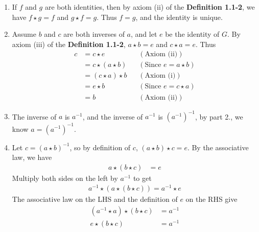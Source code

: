 {\begin{enumerate}[leftmargin=20pt, itemsep=0pt, topsep=3pt]
    \item If $f$ and $g$ are both identities, then by axiom (ii) of the \textbf{\textsf{\color{green!60!blue} Definition 1.1-2}},
    we have $f\star g = f$ and $g\star f = g$. Thus $f=g$, and the identity is unique.
\end{enumerate}}
\newpage
\thispagestyle{evenpagestyle}
\Proppf
{\begin{enumerate}[leftmargin=20pt, itemsep=0pt, topsep=0pt]
    \setcounter{enumi}{1}
    \item Assume $b$ and $c$ are both inverses of $a$, and let $e$ be the identity of $G$.
    By axiom (iii) of the \textbf{\textsf{\color{green!60!blue} Definition 1.1-2}}, $a\star b=e$ and $c\star a=e$.
    Thus
    \begin{align*}
        c &= c\star e \hspace{10pt}&(\text{Axiom (ii)})\\
        &= c\star (a\star b) \hspace{10pt}&(\text{Since } e = a\star b)\\
        &= (c\star a)\star b \hspace{10pt}&(\text{Axiom (i)})\\
        &= e\star b \hspace{10pt}&(\text{Since } e = c\star a)\\
        &= b \hspace{10pt}&(\text{Axiom (ii)})
    \end{align*}
    \item The inverse of $a$ is $a^{-1}$, and the inverse of $a^{-1}$ is $(a^{-1})^{-1}$, by part 2.,
    we know $a = (a^{-1})^{-1}$.
    \item Let $c = (a\star b)^{-1}$, so by definition of $c$, $(a\star b) \star c = e$.
    By the associative law, we have
    \begin{align*}
        a\star (b\star c) &= e
    \end{align*}
    Multiply both sides on the left by $a^{-1}$ to get
    \begin{align*}
        a^{-1}\star(a\star (b\star c)) = a^{-1}\star e
    \end{align*}
    The associative law on the LHS and the definition of $e$ on the RHS give
    \begin{align*}
        (a^{-1}\star a)\star (b\star c) &= a^{-1}\\
        e\star (b\star c) &= a^{-1}\\

\end{align*}
\end{enumerate}}
